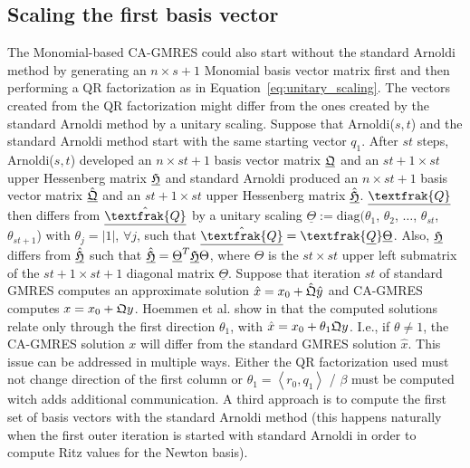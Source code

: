 \documentclass{scrartcl}
\numberwithin{equation}{section}
\begin{document}
\subsection{Scaling the first basis vector} \label{sec:scaling_first_basis_vec}
The Monomial-based CA-GMRES could also start without the standard Arnoldi method by generating an $n \times s + 1$ Monomial basis vector matrix first and then performing a QR factorization as in Equation~\eqref{eq:unitary_scaling}. The vectors created from the QR factorization might differ from the ones created by the standard Arnoldi method by a unitary scaling. Suppose that Arnoldi($s,t$) and the standard Arnoldi method start with the same starting vector $q_1$. After $st$ steps, Arnoldi($s,t$) developed an $n \times st + 1$ basis vector matrix $\underline{\frak{Q}}$ and an $st + 1 \times st$ upper Hessenberg matrix $\underline{\frak{H}}$ and standard Arnoldi produced an $n \times st + 1$ basis vector matrix $\underline{\hat{\frak{Q}}}$ and an $st + 1 \times st$ upper Hessenberg matrix $\underline{\hat{\frak{H}}}$. $\underline{\textfrak{Q}}$ then differs from $\underline{\hat{\textfrak{Q}}}$ by a unitary scaling $\underline{\Theta} := \text{diag}(\theta_1$, $\theta_2$, $\ldots$, $\theta_{st}$, $\theta_{st+1}$) with $\theta_j = |1|$,  $\forall j$, such that $\underline{\hat{\textfrak{Q}}} = \textfrak{\underline{Q}}\underline{\Theta}$. Also, $\underline{\frak{H}}$ differs from $\underline{\hat{\frak{H}}}$ such that $\hat{\underline{\frak{H}}} = \underline{\Theta}^T \underline{\frak{H}} \Theta$, where $\Theta$ is the $st \times st$ upper left submatrix of the $st + 1 \times st + 1$ diagonal matrix $\underline{\Theta}$. Suppose that iteration $st$ of standard GMRES computes an approximate solution $\hat{x} = x_0 + \hat{\frak{Q}} \hat{y}$ and CA-GMRES computes $x = x_0 + \frak{Q} y$. Hoemmen et al. show in \cite{Hoemmen:2010:CKS:1970638} that the computed solutions relate only through the first direction $\theta_1$, with $\hat{x} = x_0 + \theta_1 \frak{Q}y$. I.e., if $\theta \ne 1$, the CA-GMRES solution $x$ will differ from the standard GMRES solution $\hat{x}$.
This issue can be addressed in multiple ways. Either the QR factorization used must not change direction of the first column or $\theta_1 = \left< r_0, q_1 \right>$ / $\beta$ must be computed witch adds additional communication. A third approach is to compute the first set of basis vectors with the standard Arnoldi method (this happens naturally when the first outer iteration is started with standard Arnoldi in order to compute Ritz values for the Newton basis).
\end{document}
